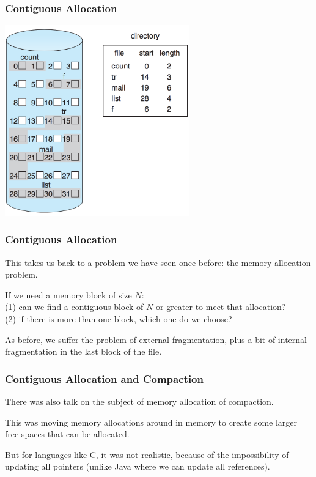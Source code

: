 \begin{frame}
\frametitle{Contiguous Allocation}

\begin{center}
	\includegraphics[width=0.6\textwidth]{images/disk-contiguous.png}
\end{center}

\end{frame}

\begin{frame}
\frametitle{Contiguous Allocation}

This takes us back to a problem we have seen once before: the memory allocation problem. 

If we need a memory block of size $N$:\\
\quad (1) can we find a contiguous block of $N$ or greater to meet that allocation?\\
\quad (2) if there is more than one block, which one do we choose? 

As before, we suffer the problem of external fragmentation, plus a bit of internal fragmentation in the last block of the file. 

\end{frame}

\begin{frame}
\frametitle{Contiguous Allocation and Compaction}

There was also talk on the subject of memory allocation of compaction. 

This was moving memory allocations around in memory to create some larger free spaces that can be allocated. 

But for languages like C, it was not realistic, because of the impossibility of updating all pointers (unlike Java where we can update all references). 

\end{frame}

